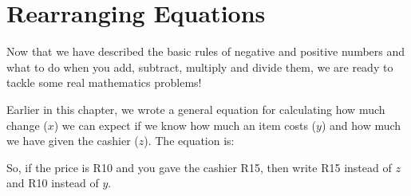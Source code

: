     \section{Rearranging Equations}
            \nopagebreak
      \label{m38346*id175988}Now that we have described the basic rules of negative and positive numbers and
what to do when you add, subtract, multiply and divide them, we are ready to
tackle some real mathematics problems!\par 
      \label{m38346*id175993}Earlier in this chapter, we wrote a general equation for calculating how much
change ($x$) we can expect if we know how much an item costs ($y$) and how much
we have given the cashier ($z$). The equation is:\par 
      \label{m38346*uid35}\nopagebreak\noindent{}
      \label{m38346*id176050}So, if the price is R10 and you gave the cashier R15, then write R15 instead of
$z$ and R10 instead of $y$.\par 
      \label{m38346*uid36}\nopagebreak\noindent{}
